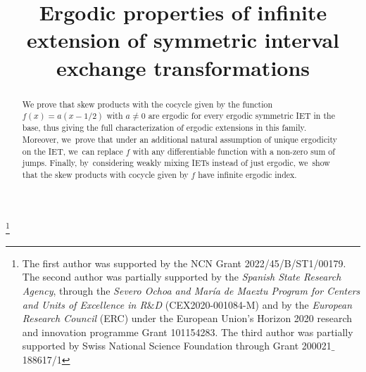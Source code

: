\documentclass[JEP,XML,SOM,Unicode,NoEqCountersInSection,NoFloatCountersInSection,published]{cedram}
\theoremstyle{plain}
\theoremstyle{definition}
\begin{document}
\frontmatter
\title[Linear cocycles]{Ergodic properties of infinite extension of symmetric interval exchange transformations}

\author[\initial{P.} \lastname{Berk}]{ }
\address{Faculty of Mathematics and Computer Science, Nicolaus
Copernicus University,\\
ul. Chopina 12/18, 87-100 Toru\'n, Poland}

\author[\initial{F.} \lastname{Trujillo}]{ }
\address{Centre de Recerca Matemàtica,\\
08193 Bellaterra, Barcelona, Spain}

\author[\initial{H.} \lastname{Wu}]{ }
\address{Institut für Mathematik, Universität Zürich,\\
Winterthurerstrasse 190, CH-8057 Zürich, Switzerland}

\thanks{The first author was supported by the NCN Grant 2022/45/B/ST1/00179. The second author was partially supported by the {\it Spanish State Research Agency}, through the {\it Severo Ochoa and María de Maeztu Program for Centers and Units of Excellence in R$\&$D} (CEX2020-001084-M) and by the {\it European Research Council} (ERC) under the European Union's Horizon 2020 research and innovation programme Grant 101154283. The third author was partially supported by Swiss National Science Foundation through Grant 200021$\_$188617/1}

\begin{abstract}
We prove that skew products with the cocycle given by the function $f(x)=a(x-1/2)$ with $a\neq 0$ are ergodic for every ergodic symmetric IET in the base, thus giving the full characterization of ergodic extensions in this family. Moreover, we~prove that under an additional natural assumption of unique ergodicity on the IET, we~can replace $f$ with any differentiable function with a non-zero sum of jumps. Finally, by~considering weakly mixing IETs instead of just ergodic, we~show that the skew products with cocycle given by $f$ have infinite ergodic index.
\end{abstract}



\end{document}
